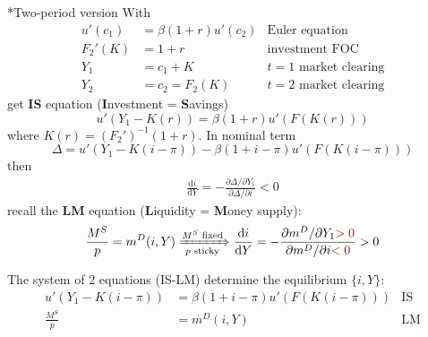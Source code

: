 \documentclass[10pt,landscape,a4paper]{article}
\makeatletter
\renewcommand{\subsubsection}{\@startsection{subsubsection}{1}{0mm}{.2ex}{.2ex}{\bfseries}}
\makeatother
\begin{document}
\begin{multicols*}{3}
\subsubsection*{Two-period version}
With 
\begin{align*}
    u'(c_1) &= \beta(1+r)u'(c_2) &\text{Euler equation}\\
    F_2'(K)&= 1+r & \text{investment FOC}\\
    Y_1 &=c_1+K & t=1 \text{ market clearing}\\
    Y_2 &=c_2 = F_2(K) & t=2 \text{ market clearing}
\end{align*}
get \textbf{IS} equation (\textbf{I}nvestment = \textbf{S}avings)
$$
u'(Y_1-K(r)) = \beta(1+r)u'(F(K(r)))
$$
where $K(r) = (F_2')^{-1}(1+r)$. In nominal term
$$
\Delta = u'(Y_1-K(i-\pi))- \beta(1+i-\pi)u'(F(K(i-\pi)))
$$
then
\begin{align*}
    \frac{\mathrm{d}i}{\mathrm{d}Y} = -\frac{\partial \Delta/\partial Y_1}{\partial \Delta/\partial i} <0
\end{align*}
recall the \textbf{LM} equation (\textbf{L}iquidity = \textbf{M}oney supply):
$$
\frac{M^S}{p}=m^D(i,Y) \xRightarrow[p \text{ sticky}]{M^S\text{ fixed}} \frac{\mathrm{d}i}{\mathrm{d}Y} = -\frac{\partial m^D/\partial Y_1{\color{myred}>0}}{\partial m^D/\partial i{\color{myred}<0}} >0
$$

The system of 2 equations (IS-LM) determine the equilibrium $\{i,Y\}$:
\begin{align*}
    u'(Y_1-K(i-\pi)) &= \beta(1+i-\pi)u'(F(K(i-\pi))) & \text{IS}\\
    \frac{M^S}{p} &= m^D(i,Y) & \text{LM}\\
\end{align*}

\begin{center}
\end{center}


\end{multicols*}
\end{document}
